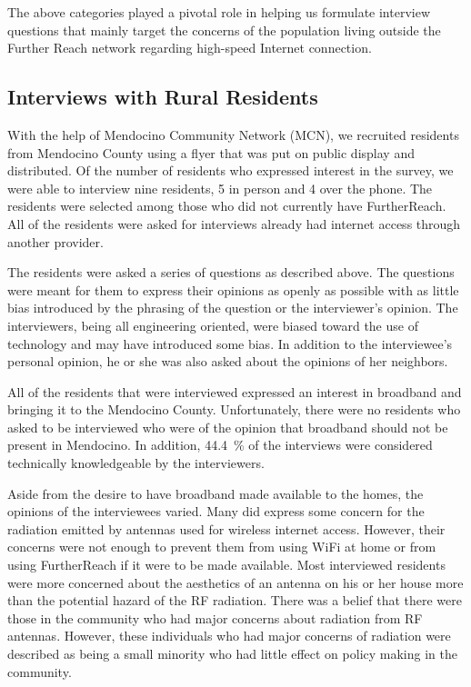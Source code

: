 The above categories played a pivotal role in helping us formulate interview questions that mainly target the concerns of the population living outside the Further Reach network regarding high-speed Internet connection.

\subsection{Interviews with Rural Residents}
\label{sec:interv-with-rural}

With the help of Mendocino Community Network (MCN), we recruited 
residents from Mendocino County using a flyer that was put on public display and distributed.
Of the number of residents who expressed interest in the survey, we were able to interview
nine residents, 5 in person and 4 over the phone. The residents were selected among those
who did not currently have FurtherReach. All of the residents were asked for interviews
already had internet access through another provider.

The residents were asked a series of questions as described above. The questions were meant for
them to express their opinions as openly as possible with as little bias introduced by the
phrasing of the question or the interviewer's opinion. The interviewers, being all engineering
oriented, were biased toward the use of technology and may have introduced some bias. In addition
to the interviewee's personal opinion, he or she was also asked about the opinions of her
neighbors.

All of the residents that were interviewed expressed an interest in broadband and bringing it
to the Mendocino County. Unfortunately, there were no residents who asked to be interviewed who 
were of the opinion that broadband should not be present in Mendocino. In addition, 44.4~\% of
the interviews were considered technically knowledgeable by the interviewers.

Aside from the desire to have broadband made available to the homes, the opinions of the 
interviewees varied. Many did express some concern for the radiation emitted by antennas
used for wireless internet access. However, their concerns were not enough to prevent them
from using WiFi at home or from using FurtherReach if it were to be made available.
Most interviewed residents were more concerned about the aesthetics of an antenna on his or her
house more than the potential hazard of the RF radiation.
There was a belief that there were those in the community who had major concerns about radiation
from RF antennas. However, these individuals who had major concerns of radiation were described
as being a small minority who had little effect on policy making in the community.

